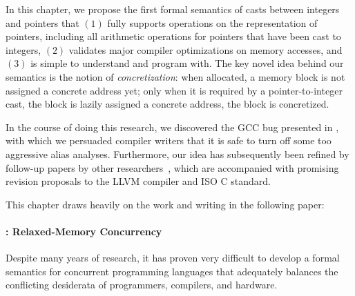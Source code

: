 In this chapter, we propose the first formal semantics of casts between integers and pointers that
$(1)$ fully supports operations on the representation of pointers, including all arithmetic
operations for pointers that have been cast to integers, $(2)$ validates major compiler
optimizations on memory accesses, and $(3)$ is simple to understand and program with.  The key novel
idea behind our semantics is the notion of \emph{concretization}: when allocated, a memory block is
not assigned a concrete address yet; only when it is required by a pointer-to-integer cast, the
block is lazily assigned a concrete address, \ie{} the block is concretized.

In the course of doing this research, we discovered the GCC bug presented in
, with which we persuaded compiler writers that it is safe to turn off
some too aggressive alias analyses.  Furthermore, our idea has subsequently been refined by
follow-up papers by other researchers~\cite{intptrcast-oopsla,intptrcast-popl}, which are
accompanied with promising revision proposals to the LLVM compiler and ISO C standard.



This chapter draws heavily on the work and writing in the following paper:


\paragraph{: Relaxed-Memory Concurrency}

Despite many years of research, it has proven very difficult to develop a formal semantics for
concurrent programming languages that adequately balances the conflicting desiderata of programmers,
compilers, and hardware.

